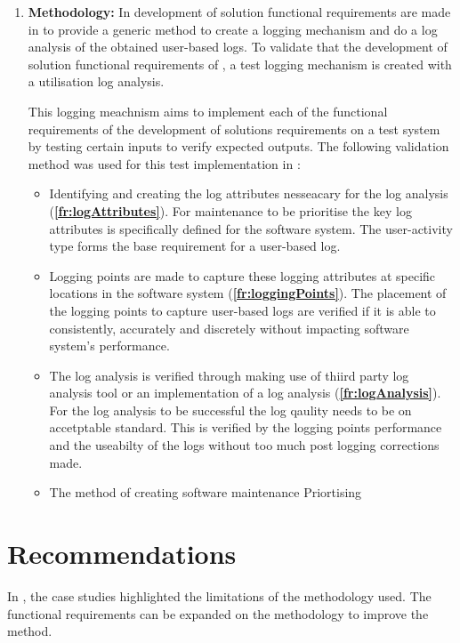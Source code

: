 \begin{enumerate}[label=\textbf{\Roman*.}]
	\item \textbf{Methodology:} In  development of solution functional requirements are made in  to provide a generic method to create a logging mechanism and do a log analysis of the obtained user-based logs. To validate that the development of solution functional requirements of , a test logging mechanism is created with a utilisation log analysis.\par This logging meachnism aims to implement each of the functional requirements of the development of solutions requirements on a test system by testing certain inputs to verify expected outputs. The following validation method was used for this test implementation in :
		\begin{itemize}
			\item Identifying and creating the log attributes nesseacary for the log analysis (\textbf{\ref{fr:logAttributes}}). For maintenance to be prioritise the key log attributes is specifically defined for the software system. The user-activity type forms the base requirement for a user-based log.
			
			\item Logging points are made to capture these logging attributes at specific locations in the software system (\textbf{\ref{fr:loggingPoints}}). The placement of the logging points to capture user-based logs are verified if it is able to consistently, accurately and discretely without impacting software system's performance. 
			
			\item The log analysis is verified through making use of thiird party log analysis tool or an implementation of a log analysis (\textbf{\ref{fr:logAnalysis}}). For the log analysis to be successful the log qaulity needs to be on accetptable standard. This is verified by the logging points performance and the useabilty of the logs without too much post logging corrections made.
			
			\item The method of creating software maintenance Priortising
		\end{itemize}
\end{enumerate}

\section{Recommendations}
In , the case studies highlighted the limitations of the methodology used.
The functional requirements can be expanded on the methodology to improve the method.

